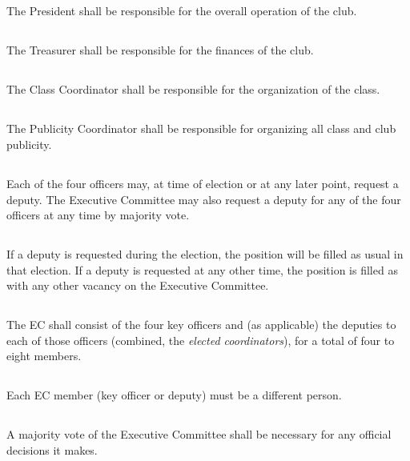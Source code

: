 \documentclass{bylaws}
\begin{document}
\subsection{}The President shall be responsible for the overall operation of the club.
\subsection{}The Treasurer shall be responsible for the finances of the club.
\subsection{}The Class Coordinator shall be responsible for the organization of the class.
\subsection{}The Publicity Coordinator shall be responsible for organizing all class and club publicity.

\subsection{}Each of the four officers may, at time of election or at any later point, request a deputy. The Executive Committee may also request a deputy for any of the four officers at any time by majority vote.
\subsection{}If a deputy is requested during the election, the position will be filled as usual in that election. If a deputy is requested at any other time, the position is filled as with any other vacancy on the Executive Committee.
\subsection{}The EC shall consist of the four key officers and (as applicable) the deputies to each of those officers (combined, the \textit{elected coordinators}), for a total of four to eight members.
\subsection{}Each EC member (key officer or deputy) must be a different person.

\subsection{}A majority vote of the Executive Committee shall be necessary for any official decisions it makes.
\end{document}
